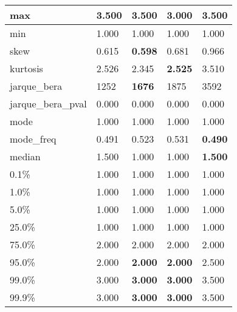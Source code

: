 \begin{table}[H]
\begin{tabular}{|l|m{10em}|m{10em}|m{10em}|m{10em}|}
\hline max & 3.500 & \bfseries 3.500 & \cellcolor[rgb]{0.9, 0.54, 0.52} 3.000 & \bfseries 3.500 \\
\hline min & 1.000 & 1.000 & 1.000 & 1.000 \\
\hline skew & 0.615 & \bfseries 0.598 & 0.681 & \cellcolor[rgb]{0.9, 0.54, 0.52} 0.966 \\
\hline kurtosis & 2.526 & 2.345 & \bfseries 2.525 & \cellcolor[rgb]{0.9, 0.54, 0.52} 3.510 \\
\hline jarque\_bera & 1252 & \bfseries 1676 & 1875 & \cellcolor[rgb]{0.9, 0.54, 0.52} 3592 \\
\hline jarque\_bera\_pval & 0.000 & 0.000 & 0.000 & 0.000 \\
\hline mode & 1.000 & 1.000 & 1.000 & 1.000 \\
\hline mode\_freq & 0.491 & 0.523 & \cellcolor[rgb]{0.9, 0.54, 0.52} 0.531 & \bfseries 0.490 \\
\hline median & 1.500 & \cellcolor[rgb]{0.9, 0.54, 0.52} 1.000 & \cellcolor[rgb]{0.9, 0.54, 0.52} 1.000 & \bfseries 1.500 \\
\hline 0.1\% & 1.000 & 1.000 & 1.000 & 1.000 \\
\hline 1.0\% & 1.000 & 1.000 & 1.000 & 1.000 \\
\hline 5.0\% & 1.000 & 1.000 & 1.000 & 1.000 \\
\hline 25.0\% & 1.000 & 1.000 & 1.000 & 1.000 \\
\hline 75.0\% & 2.000 & 2.000 & 2.000 & 2.000 \\
\hline 95.0\% & 2.000 & \bfseries 2.000 & \bfseries 2.000 & \cellcolor[rgb]{0.9, 0.54, 0.52} 2.500 \\
\hline 99.0\% & 3.000 & \bfseries 3.000 & \bfseries 3.000 & \cellcolor[rgb]{0.9, 0.54, 0.52} 3.500 \\
\hline 99.9\% & 3.000 & \bfseries 3.000 & \bfseries 3.000 & \cellcolor[rgb]{0.9, 0.54, 0.52} 3.500 \\
\hline
\end{tabular}
\end{table}
